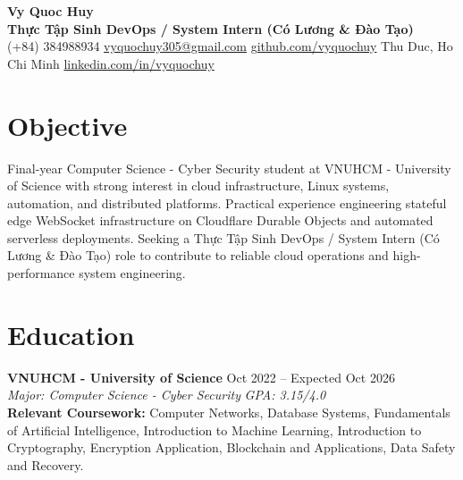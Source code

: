 \documentclass[10pt,a4paper]{article}
\begin{document}
\pagestyle{empty}

\begin{center}
    {\huge \textbf{Vy Quoc Huy}} \\ \vspace{4pt}
    {\Large \textbf{Thực Tập Sinh DevOps / System Intern (Có Lương & Đào Tạo)}} \\ \vspace{4pt}
    (+84) 384988934 \quad \href{mailto:vyquochuy305@gmail.com}{vyquochuy305@gmail.com} \quad \href{https://github.com/vyquochuy}{github.com/vyquochuy} \quad Thu Duc, Ho Chi Minh \quad \href{https://www.linkedin.com/in/vyquochuy/}{linkedin.com/in/vyquochuy}
\end{center}

\section*{Objective}
Final-year Computer Science - Cyber Security student at VNUHCM - University of Science with strong interest in cloud infrastructure, Linux systems, automation, and distributed platforms. Practical experience engineering stateful edge WebSocket infrastructure on Cloudflare Durable Objects and automated serverless deployments. Seeking a Thực Tập Sinh DevOps / System Intern (Có Lương \& Đào Tạo) role to contribute to reliable cloud operations and high-performance system engineering.

\section*{Education}
\noindent \textbf{VNUHCM - University of Science} \hfill Oct 2022 -- Expected Oct 2026\\
\textit{Major: Computer Science - Cyber Security} \hfill \textit{GPA: 3.15/4.0}\\
\textbf{Relevant Coursework:} Computer Networks, Database Systems, Fundamentals of Artificial Intelligence, Introduction to Machine Learning, Introduction to Cryptography, Encryption Application, Blockchain and Applications, Data Safety and Recovery.

\end{document}
